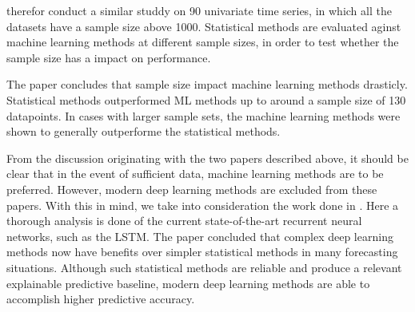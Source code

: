 \cite{Cerqueira2019} therefor conduct a similar studdy on 90 univariate time series, in which 
all the datasets have a sample size above 1000.
Statistical methods are evaluated aginst machine learning methods at different sample sizes,
in order to test whether the sample size has a impact on performance.

The paper \cite{Cerqueira2019} concludes that sample size impact machine learning methods drasticly.
Statistical methods outperformed ML methods up to around a sample size of 130 datapoints.
In cases with larger sample sets, the machine learning methods were shown to generally outperforme the statistical methods.


\iffalse
This is good news for us, as our datasets do have a sample size of well above 660 at this moment.
Depending on when we conduct the experiment, the number will grow to the range of 1000 to 1200,
as data is being gathered every day as we speak.
\todo[inline]{Should this be described when we dont describe out data? Should have section with data information if we are to inluce this!}

One drawback of the \cite{Makridakis2018} study is that it does not test any of our chosen ML methods.
They tested:
\begin{itemize}
  \item \textit{A rule-based model (RBR)}
  \item \textit{A random Forest method (RF)}
  \item \textit{Guassion Process regression (GP)}
  \item \textit{The Multivariate adative regression (MARS)}
  \item \textit{Generalized linear model (GLM)}
\end{itemize}
\fi


From the discussion originating with the two papers described above,
it should be clear that in the event of sufficient data, machine learning methods are to be preferred.
However, modern deep learning methods are excluded from these papers.
With this in mind, we take into consideration the work done in \cite{Hewamalage2021}.
Here a thorough analysis is done of the current state-of-the-art recurrent neural networks, such as the LSTM. 
The paper concluded that complex deep learning methods now have benefits over simpler statistical methods in many forecasting situations.
Although such statistical methods are reliable and produce a relevant explainable predictive baseline,
modern deep learning methods are able to accomplish higher predictive accuracy.


